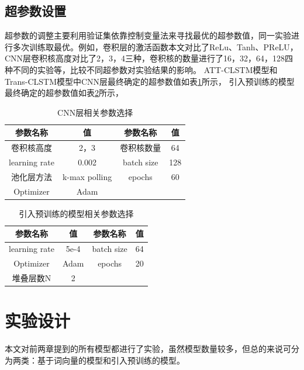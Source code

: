 \subsection{超参数设置}
超参数的调整主要利用验证集依靠控制变量法来寻找最优的超参数值，同一实验进行多次训练取最优。例如，卷积层的激活函数本文对比了ReLu、Tanh、PReLU，
CNN层卷积核高度对比了2，3，4三种，卷积核的数量进行了16，32，64，128四种不同的实验等，比较不同超参数对实验结果的影响。
ATT-CLSTM模型和Trans-CLSTM模型中CNN层最终确定的超参数值如表\ref{tab:cnnPara}所示，
引入预训练的模型最终确定的超参数值如表\ref{tab:bertPara}所示，

\begin{table}[htb]
  \centering
  \caption{CNN层相关参数选择}
  \label{tab:cnnPara}
\begin{tabular}{cc|cc}
\hline
参数名称&值&参数名称&值\\
\hline
卷积核高度&2，3&卷积核数量&64\\
learning rate&0.002&batch size&128\\
池化层方法&k-max polling&epochs &60\\
Optimizer&Adam&&\\
\hline
\end{tabular}
\end{table}

\begin{table}[htb]
  \centering
  \caption{引入预训练的模型相关参数选择}
  \label{tab:bertPara}
\begin{tabular}{cc|cc}
\hline
参数名称&值&参数名称&值\\
\hline
learning rate&5e-4&batch size&64\\
Optimizer&Adam&epochs &20\\
堆叠层数N&2&&\\
\hline
\end{tabular}
\end{table}

\section{实验设计}
本文对前两章提到的所有模型都进行了实验，虽然模型数量较多，但总的来说可分为两类：基于词向量的模型和引入预训练的模型。
